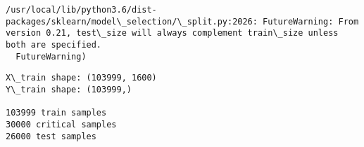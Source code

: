 \documentclass[10pt, t]{beamer}
\begin{document}
    \begin{Verbatim}[commandchars=\\\{\}]
/usr/local/lib/python3.6/dist-packages/sklearn/model\_selection/\_split.py:2026: FutureWarning: From version 0.21, test\_size will always complement train\_size unless both are specified.
  FutureWarning)

    \end{Verbatim}

    \begin{Verbatim}[commandchars=\\\{\}]
X\_train shape: (103999, 1600)
Y\_train shape: (103999,)

103999 train samples
30000 critical samples
26000 test samples

    \end{Verbatim}
\end{document}
